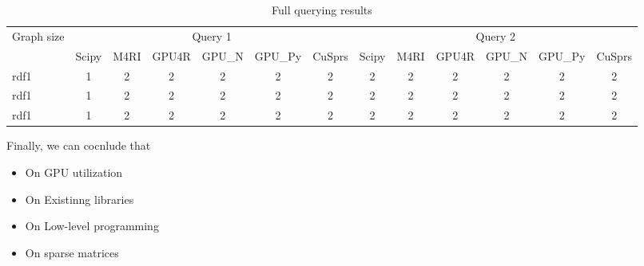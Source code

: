\begin{table*}
\caption{Full querying results}
\label{tbl:tableFull}
\begin{tabular}{| l | c | c | c | c | c | c | c | c | c | c | c | c |}
    \hline
    \multirow{2}{*}{Graph size} & \multicolumn{6}{|c|}{Query 1}                               & \multicolumn{6}{|c|}{Query 2} \\ 
    \cline{2-13}
                         & Scipy & M4RI & GPU4R & GPU\_N & GPU\_Py & CuSprs & Scipy & M4RI & GPU4R & GPU\_N & GPU\_Py & CuSprs \\
    \hline
    \hline
    rdf1 & 1 & 2 & 2& 2& 2& 2& 2& 2& 2& 2& 2& 2\\ 
    rdf1 & 1 & 2 & 2& 2& 2& 2& 2& 2& 2& 2& 2& 2\\ 
    rdf1 & 1 & 2 & 2& 2& 2& 2& 2& 2& 2& 2& 2& 2\\ 
    \hline
  \end{tabular}
\end{table*}


Finally, we can cocnlude that
\begin{itemize}
\item On GPU utilization
\item On Existinng libraries
\item On Low-level programming
\item On sparse matrices
\end{itemize}
